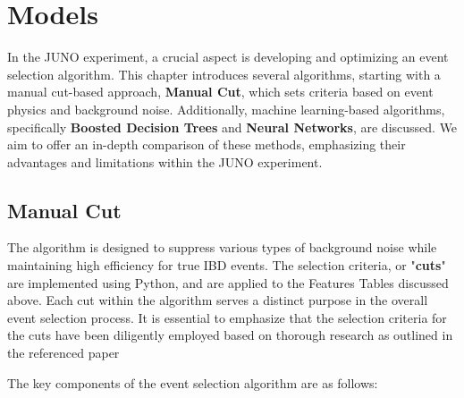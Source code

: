 \section{Models}
In the JUNO experiment, a crucial aspect is developing and optimizing an event selection algorithm. This chapter introduces several algorithms, starting with a manual cut-based approach, \textbf{Manual Cut}, which sets criteria based on event physics and background noise. Additionally, machine learning-based algorithms, specifically \textbf{Boosted Decision Trees} and \textbf{Neural Networks}, are discussed. We aim to offer an in-depth comparison of these methods, emphasizing their advantages and limitations within the JUNO experiment.

\subsection{Manual Cut}
The algorithm is designed to suppress various types of background noise while maintaining high efficiency for true IBD events. The selection criteria, or "\textbf{cuts}" are implemented using Python, and are applied to the Features Tables discussed above. Each cut within the algorithm serves a distinct purpose in the overall event selection process. It is essential to emphasize that the selection criteria for the cuts have been diligently employed based on thorough research as outlined in the referenced paper %

The key components of the event selection algorithm are as follows:


